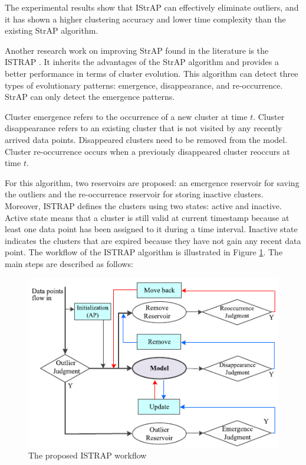 The experimental results show that IStrAP can effectively eliminate outliers, and it has shown a higher clustering accuracy and lower time complexity than the existing StrAP algorithm. 



Another research work on improving StrAP found in the literature is the ISTRAP \cite{sui2018dynamic}. It inherits the advantages of the StrAP algorithm and provides a better performance in terms of cluster evolution. This algorithm can detect three types of evolutionary patterns: emergence, disappearance, and re-occurrence. StrAP can only detect the emergence patterns. 

Cluster emergence refers to the occurrence of a new cluster at time $t$. Cluster disappearance refers to an existing cluster that is not visited by any recently arrived data points. Disappeared clusters need to be removed from the model. Cluster re-occurrence occurs when a previously disappeared cluster reoccurs at time $t$.

For this algorithm, two reservoirs are proposed: an emergence reservoir for saving the outliers and the re-occurrence reservoir for storing inactive clusters. Moreover, ISTRAP defines the clusters using two states: active and inactive. Active state means that a cluster is still valid at current timestamp because at least one data point has been assigned to it during a time interval. Inactive state indicates the clusters that are expired because they have not gain any recent data point. The workflow of the ISTRAP algorithm is illustrated in Figure \ref{istrap}. The main steps are described as follows:

\begin{figure}
\centering
\includegraphics[width =10 cm]{image/Chapters/Chapter3/istrap1.PNG}
\caption{The proposed ISTRAP workflow}
\label{istrap}
\end{figure}

